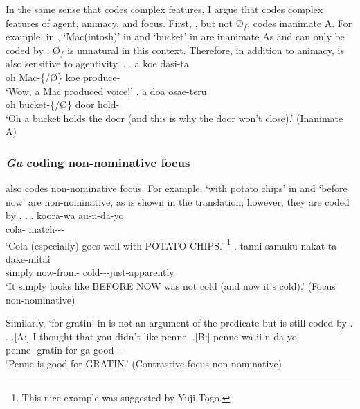 In the same sense that  codes complex features,
I argue that  codes complex features
of agent, animacy, and focus.
First,
, but not {\O$_{f}$}, codes inanimate A.
For example, in \Next,
 `Mac(intosh)' in \Next[a] and  `bucket' in \Next[b]
are inanimate As
and can only be coded by ;
{\O$_{f}$} is unnatural in this context.
Therefore, in addition to animacy,
 is also sensitive to agentivity.
%
\ex. \label{ExInanimateA}
 \ag. a  koe dasi-ta \\
  oh Mac-\{/{\O}\} koe produce- \\
  `Wow, a Mac produced voice!'
 \bg. a  doa osae-teru \\
  oh bucket-\{/{\O}\} door hold- \\
  `Oh a bucket holds the door (and this is why the door won't close).'
   \hfill{(Inanimate A)}

\subsubsection{\textit{Ga} coding non-nominative focus}\label{Par:CasePar:Ga:GaFoc}

 also codes non-nominative focus.
For example, 
 `with potato chips' in \Next[a] and
 `before now'
are non-nominative,
as is shown in the translation;
however, they are coded by .
%
\ex.\label{ExNon-ArgFocus}
 \ag. koora-wa  au-n-da-yo \\
   cola-  match--- \\
   `Cola (especially) goes well with POTATO CHIPS.'%
    \footnote{
    This nice example was suggested by Yuji Togo.
    }
 \bg. tanni  samuku-nakat-ta-dake-mitai \\
   simply now-from- cold---just-apparently \\
   `It simply looks like BEFORE NOW was not cold (and now it's cold).'
 \hfill{(Focus non-nominative)}

Similarly,
 `for gratin' in \Next[B] is not an argument of the predicate
but is still coded by .
%
\ex. \a.[A:] I thought that you didn't like penne.
	\bg.[B:] penne-wa  ii-n-da-yo \\
	penne- gratin-for-{ga} good--- \\
	`Penne is good for GRATIN.' \hfill{(Contrastive focus non-nominative)}

